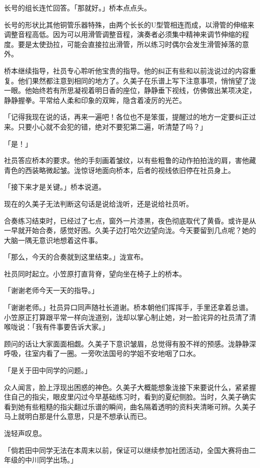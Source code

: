 \documentclass[UTF8]{ctexart}
\begin{document}
    长号的组长连忙回答。「那就好。」桥本点点头。 

    长号的形状比其他铜管乐器特殊，由两个长长的U型管相连而成，以滑管的伸缩来调整音程高低。因为可以用滑管调整音程，演奏者必须集中精神来调节伸缩的程度。要是太使劲拉，可能会直接拉出滑管，所以练习时偶尔会发生滑管掉落的意外。 

    桥本继续指导，社员专心聆听他宝贵的指导。他的纠正有些和以前泷说过的内容重复。他们果然都注意到相同的地方了。久美子在乐谱上写下注意事项，悄悄望了泷一眼。他始终若有所思凝视着明日香的座位，静静垂下视线，仿佛做出某项决定，静静握拳。平常给人柔和印象的双眸，隐含着凌厉的光芒。 

    「记得我现在说的话，再来一遍吧！各位也不是笨蛋，提醒过的地方一定要纠正过来。只要小心就不会犯的错，绝对不要犯第二遍，听清楚了吗？」 

    「是！」 

    社员答应桥本的要求。他的手刻画着皱纹，以有些粗鲁的动作拍拍泷的肩，害他藏青色的西装略微起皱。泷惊讶地面向桥本，后者的视线依旧停在社员身上。 

    「接下来才是关键。」桥本说道。 

    现在的久美子无法判断这句话是说给泷听，还是说给社员听。 

    合奏练习结束时，已经过了七点，窗外一片漆黑，夜色彻底取代了黄昏。或许是从一早就开始合奏，感觉好困。久美子边打哈欠边望向泷。今天要留到几点呢？她的大脑一隅无意识地想着这件事。 

    「那么，今天的合奏就到这里结束。」泷宣布。 

    社员同时起立。小笠原打直背脊，望向坐在椅子上的桥本。 

    「谢谢老师今天一天的指导。」 

    「谢谢老师。」社员异口同声随社长道谢。桥本朝他们挥挥手，手里还拿着总谱。小笠原正打算跟平常一样向泷道别，泷却以掌心制止她，对一脸诧异的社员清了清喉咙说：「我有件事要告诉大家。」 

    顾问的话让大家面面相觑。久美子下意识皱眉，总觉得有股不祥的预感。泷静静深呼吸，往室内看了一圈。一旁吹法国号的学姐不安地咽了口水。 

    「是关于田中同学的问题。」 

    众人闻言，脸上浮现出困惑的神色。久美子大概能想象泷接下来要说什么，紧紧握住自己的指尖，眼皮里闪过今早基础练习时，看到的夏纪侧脸。当时，久美子确实看到她有些粗糙的指尖翻过乐谱的瞬间，曲名隔着透明的资料夹清晰可辨。久美子马上就明白那是什么意思，只是不想承认而已。 

    泷轻声叹息。 

    「倘若田中同学无法在本周末以前，保证可以继续参加社团活动，全国大赛将由二年级的中川同学出场。」 
\end{document}

